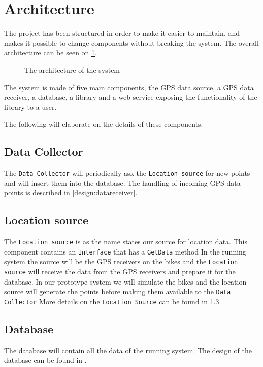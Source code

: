 \section{Architecture}

The project has been structured in order to make it easier to maintain, and makes it possible to change components without breaking the system.
The overall architecture can be seen on \cref{arch}.

\begin{figure}[h]
\center

\caption{The architecture of the system}
\label{arch}
\end{figure}

The system is made of five main components, the GPS data source, a GPS data receiver, a database, a library and a web service exposing the functionality of the library to a user.

The following will elaborate on the details of these components.

\subsection{Data Collector}
The \texttt{Data Collector} will periodically ask the \texttt{Location source} for new points and will insert them into the database. 
The handling of incoming GPS data points is described in \cref{design:datareceiver}.

\subsection{Location source}
The \texttt{Location source} is as the name states our source for location data.
This component contains an \texttt{Interface} that has a \texttt{GetData} method 
In the running system the source will be the GPS receivers on the bikes and the \texttt{Location source} will receive the data from the GPS receivers and prepare it for the database.
In our prototype system we will simulate the bikes and the location source will generate the points before making them available to the \texttt{Data Collector}
More details on the \texttt{Location Source} can be found in \cref{} 


\subsection{Database}
The database will contain all the data of the running system.
The design of the database can be found in .

